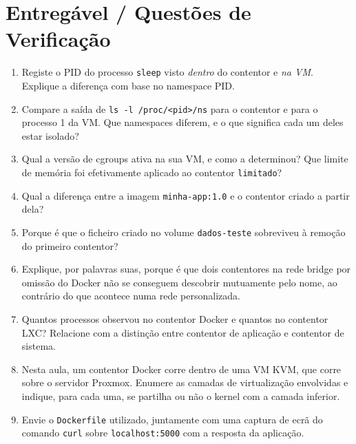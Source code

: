 \documentclass[11pt,a4paper]{article}
\begin{document}
\section{Entregável / Questões de Verificação}
\begin{enumerate}[label=\alph*)]
  \setlength\itemsep{0.2cm}
  \item Registe o PID do processo \texttt{sleep} visto \emph{dentro} do contentor e \emph{na VM}. Explique a diferença com base no namespace PID.
  \item Compare a saída de \texttt{ls -l /proc/<pid>/ns} para o contentor e para o processo 1 da VM. Que namespaces diferem, e o que significa cada um deles estar isolado?
  \item Qual a versão de cgroups ativa na sua VM, e como a determinou? Que limite de memória foi efetivamente aplicado ao contentor \texttt{limitado}?
  \item Qual a diferença entre a imagem \texttt{minha-app:1.0} e o contentor criado a partir dela?
  \item Porque é que o ficheiro criado no volume \texttt{dados-teste} sobreviveu à remoção do primeiro contentor?
  \item Explique, por palavras suas, porque é que dois contentores na rede bridge por omissão do Docker não se conseguem descobrir mutuamente pelo nome, ao contrário do que acontece numa rede personalizada.
  \item Quantos processos observou no contentor Docker e quantos no contentor LXC? Relacione com a distinção entre contentor de aplicação e contentor de sistema.
  \item Nesta aula, um contentor Docker corre dentro de uma VM KVM, que corre sobre o servidor Proxmox. Enumere as camadas de virtualização envolvidas e indique, para cada uma, se partilha ou não o kernel com a camada inferior.
  \item Envie o \texttt{Dockerfile} utilizado, juntamente com uma captura de ecrã do comando \texttt{curl} sobre \texttt{localhost:5000} com a resposta da aplicação.
\end{enumerate}
\end{document}
